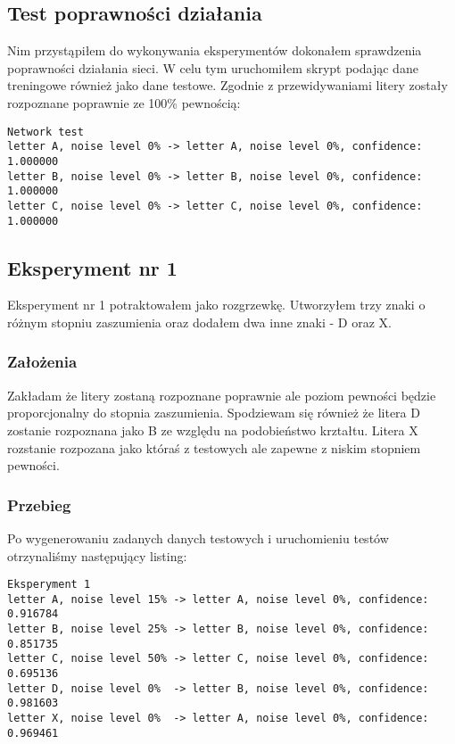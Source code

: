 \documentclass[12pt]{article}
\begin{document}
\subsection{Test poprawności działania}
Nim przystąpiłem do wykonywania eksperymentów dokonałem sprawdzenia poprawności działania sieci. W celu tym uruchomiłem skrypt podając dane treningowe również jako dane testowe. Zgodnie z przewidywaniami litery zostały rozpoznane poprawnie ze 100\% pewnością:

\begin{verbatim}
Network test
letter A, noise level 0% -> letter A, noise level 0%, confidence: 1.000000
letter B, noise level 0% -> letter B, noise level 0%, confidence: 1.000000
letter C, noise level 0% -> letter C, noise level 0%, confidence: 1.000000
\end{verbatim}

\subsection{Eksperyment nr 1}

Eksperyment nr 1 potraktowałem jako rozgrzewkę. Utworzyłem trzy znaki o różnym stopniu zaszumienia oraz dodałem dwa inne znaki - D oraz X.

\subsubsection{Założenia}
Zakładam że litery zostaną rozpoznane poprawnie ale poziom pewności będzie proporcjonalny do stopnia zaszumienia. Spodziewam się również że litera D zostanie rozpoznana jako B ze względu na podobieństwo krztałtu. Litera X rozstanie rozpozana jako któraś z testowych ale zapewne z niskim stopniem pewności.

\subsubsection{Przebieg}
Po wygenerowaniu zadanych danych testowych i uruchomieniu testów otrzynaliśmy następujący listing:
\begin{verbatim}
Eksperyment 1
letter A, noise level 15% -> letter A, noise level 0%, confidence: 0.916784
letter B, noise level 25% -> letter B, noise level 0%, confidence: 0.851735
letter C, noise level 50% -> letter C, noise level 0%, confidence: 0.695136
letter D, noise level 0%  -> letter B, noise level 0%, confidence: 0.981603
letter X, noise level 0%  -> letter A, noise level 0%, confidence: 0.969461
\end{verbatim}
\end{document}
